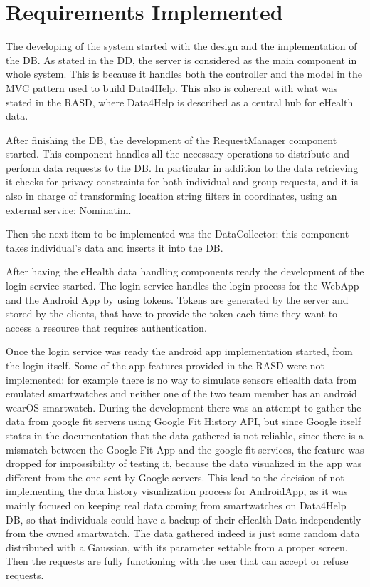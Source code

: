 \section{Requirements Implemented}

The developing of the system started with the design and  the implementation of the DB. As stated in the DD, the server is considered as the main component in whole system. This is because it handles both the controller and the model in the MVC pattern used to build Data4Help.
This also is coherent with what was stated in the RASD, where Data4Help is described as a central hub for eHealth data.
\vspace{1em}

\noindent
After finishing the DB, the development of the RequestManager component started. This component handles all the necessary operations to distribute and perform data requests to the DB. In particular in addition to the data retrieving it checks for privacy constraints for both individual and group requests, and it is also in charge of transforming location string filters in coordinates, using an external service: Nominatim.
\vspace{1em}

\noindent
Then the next item to be implemented was the DataCollector: this component takes individual's data and inserts it into the DB.
\vspace{1em}

\noindent
After having the eHealth data handling components ready the development of the login service started. The login service handles the login process for the WebApp and the Android App by using tokens. Tokens are generated by the server and stored by the clients, that have to provide the token each time they want to access a resource that requires authentication.
\vspace{1em}

\noindent
Once the login service was ready the android app implementation started, from the login itself. 
Some of the app features provided in the RASD were not implemented: for example there is no way to simulate sensors eHealth data from emulated smartwatches and neither one of the two team member has an android wearOS smartwatch. During the development there was an attempt to gather the data from google fit servers using Google Fit History API, but since Google itself states in the documentation that the data gathered is not reliable, since there is a mismatch between the Google Fit App and the google fit services, the feature was dropped for impossibility of testing it, because the data visualized in the app was different from the one sent by Google servers. This lead to the decision of not implementing the data history visualization process for AndroidApp, as it was mainly focused on keeping real data coming from smartwatches on Data4Help DB, so that individuals could have a backup of their eHealth Data independently from the owned smartwatch.
The data gathered indeed is just some random data distributed with a Gaussian, with its parameter settable from a proper screen.
Then the requests are fully functioning with the user that can accept or refuse requests.
\vspace{1em}

